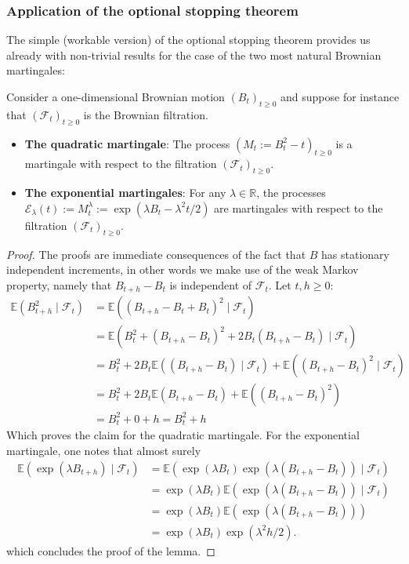 \documentclass[../mainfile.tex]{subfiles}
\begin{document}
\subsubsection{Application of the optional stopping theorem}
The simple (workable version) of the optional stopping theorem provides us already with non-trivial results for the case of the two most natural Brownian martingales:
\begin{lem} Consider a one-dimensional Brownian motion $(B_t)_{t \geq 0}$ and suppose for instance that $( \mathcal{F}_t)_{t \geq 0}$ is the Brownian filtration. 
\begin{itemize}
\item \textbf{The quadratic martingale}: The process $(M_t:= B_t^2-t)_{t \geq 0}$ is a martingale with respect to the filtration $( \mathcal{F}_t)_{t \geq 0}.$
\item \textbf{The exponential martingales}: For any $\lambda \in \mathbb{R}$, the processes \\ $\mathcal{E}_\lambda(t):= M_t^\lambda:= \exp( \lambda B_t- \lambda^2t/2)$ are martingales with respect to the filtration $( \mathcal{F}_t)_{t \geq 0}$. 
\end{itemize}
\end{lem}
\begin{proof}
The proofs are immediate consequences of the fact that $B$ has stationary independent increments, in other words we make use of the weak Markov property, namely that $B_{t+h}-B_t$ is independent of $\mathcal{F}_t$. Let $t,h \geq 0:$ 
\begin{align*}
\mathbb{E}(B_{t+h}^2 \mid \mathcal{F}_t)&= \mathbb{E}( (B_{t+h}-B_t+B_t)^2 \mid \mathcal{F}_t) \\
& = \mathbb{E}( B_t^2 + (B_{t+h}-B_t)^2+2 B_t( B_{t+h}-B_t) \mid \mathcal{F}_t) \\
& = B_t^2 + 2B_t \mathbb{E}((B_{t+h}-B_t) \mid \mathcal{F}_t) + \mathbb{E}((B_{t+h}-B_t)^2 \mid \mathcal{F}_t) \\
& = B_t^2 + 2B_t \mathbb{E}(B_{t+h}-B_t) + \mathbb{E}((B_{t+h}-B_t)^2) \\
&= B_t^2 + 0 + h = B_t^2 +h 
\end{align*}
Which proves the claim for the quadratic martingale. 
\newpage
For the exponential martingale, one notes that almost surely
\begin{align*}
\mathbb{E}(\exp( \lambda B_{t+h} )\mid \mathcal{F}_t) &= \mathbb{E}( \exp( \lambda B_t) \exp( \lambda (B_{t+h}-B_t)) \mid \mathcal{F}_t) \\
&= \exp( \lambda B_t) \mathbb{E}( \exp( \lambda (B_{t+h}-B_t)) \mid \mathcal{F}_t) \\
&= \exp( \lambda B_t) \mathbb{E}( \exp( \lambda (B_{t+h}-B_t))) \\
&= \exp( \lambda B_t) \exp( \lambda^2h/2). 
\end{align*}
which concludes the proof of the lemma. 
\end{proof}
\end{document}
